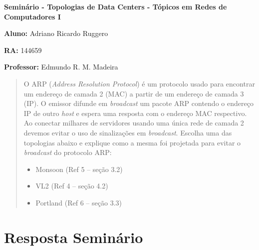 \documentclass[12pt,twoside,a4paper]{article}
\begin{document}
\vskip 15mm

\begin{center} 
\textbf{Seminário  - Topologias de Data Centers - Tópicos em Redes de Computadores I}

\end{center}

\vskip 5mm

\textbf{Aluno:} Adriano Ricardo Ruggero

\textbf{RA:} 144659

\textbf{Professor:} Edmundo R. M. Madeira

\vskip 20mm

\begin{abstract}

O ARP (\textit{Address Resolution Protocol}) é um protocolo usado
para encontrar um endereço de camada 2 (MAC) a partir de
um endereço de camada 3 (IP). O emissor difunde em
\textit{broadcast} um pacote ARP contendo o endereço IP de outro
\textit{host} e espera uma resposta com o endereço MAC respectivo.
Ao conectar milhares de servidores usando uma única rede
de camada 2 devemos evitar o uso de sinalizações em
\textit{broadcast}. Escolha uma das topologias abaixo e explique
como a mesma foi projetada para evitar o \textit{broadcast} do
protocolo ARP:
\begin{itemize}

\item Monsoon (Ref 5 – seção 3.2)

\item VL2 (Ref 4 – seção 4.2)

\item Portland (Ref 6 – seção 3.3)

\end{itemize}

\end{abstract}

\newpage
\pagestyle{plain}
\headheight 0.0cm
\headsep 0.0cm
\footskip 2.2cm

\section{Resposta Seminário}
\label{sec:01}
\end{document}
